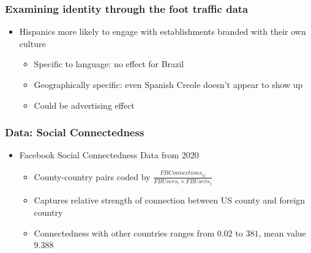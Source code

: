 \documentclass{beamer}
\begin{document}
\begin{frame}
\frametitle{Examining identity through the foot traffic data}
\begin{itemize}
\item Hispanics more likely to engage with establishments branded with their own culture
\begin{itemize}
\item Specific to language: no effect for Brazil
\item Geographically specific: even Spanish Creole doesn't appear to show up
\item Could be advertising effect 
\end{itemize}
\end{itemize}
\end{frame}

\begin{frame}
\frametitle{Data: Social Connectedness}
\begin{itemize}
\item Facebook Social Connectedness Data from 2020
\begin{itemize}
\item County-country pairs coded by $\frac{FB Connections_{ij}}{FB Users_{i} \times FB Users_{j}}$
\item Captures relative strength of connection between US county and foreign country
\item Connectedness with other countries ranges from $0.02$ to $381$, mean value $9.388$
\end{itemize}
\end{itemize}
\end{frame}
\end{document}
